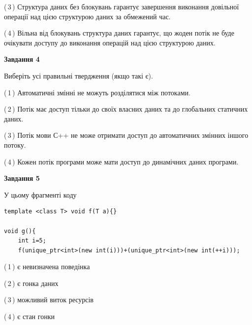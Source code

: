 \documentclass[12pt, ukrainian]{article}
\begin{document}
\begin {large}
{(\,3\,) Структура даних без блокувань гарантує завершення виконання довільної операції над цією структурою даних за обмежений час.%

(\,4\,) Вільна від блокувань структура даних гарантує, що жоден потік не буде очікувати доступу до виконання операцій над цією структурою даних.%



\begin{center}
\textbf{Завдання 4}
\end{center}
Виберіть усі правильні твердження (якщо такі є).\par
\vspace{2mm}

(\,1\,) Автоматичні змінні не можуть розділятися між потоками.%

(\,2\,) Потік має доступ тільки до своїх власних даних та до глобальних статичних даних.%

(\,3\,) Потік мови С++ не може отримати доступ до автоматичних змінних іншого потоку.%

(\,4\,) Кожен потік програми може мати доступ до динамічних даних програми.%



\begin{center}
\textbf{Завдання 5}
\end{center}
У цьому фрагменті коду
\begin{verbatim}
template <class T> void f(T a){}

void g(){
    int i=5;
    f(unique_ptr<int>(new int(i)))+(unique_ptr<int>(new int(++i)));
\end{verbatim}
(\,1\,) є невизначена поведінка%

(\,2\,) є гонка даних%

(\,3\,) можливий виток ресурсів%

(\,4\,) є стан гонки%


}
\end {large}
\end{document}
